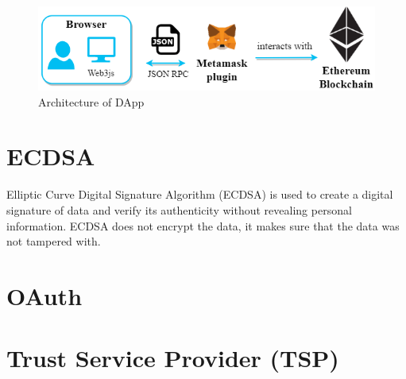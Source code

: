 \begin{figure}[hb]
    \centering
    \includegraphics[height=!,width=1\linewidth,keepaspectratio=true]{figures/architecture_of_dapp.png}
    \caption{{\footnotesize Architecture of DApp}}
    \label{fig:architecture_of_dapp}
\end{figure}

\newpage

\section{ECDSA}
Elliptic Curve Digital Signature Algorithm (ECDSA) is used to create a digital signature of data and verify its authenticity without revealing personal information. ECDSA does not encrypt the data, it makes sure that the data was not tampered with.

\section{OAuth}
\newpage

\section{Trust Service Provider (TSP)}
\newpage

